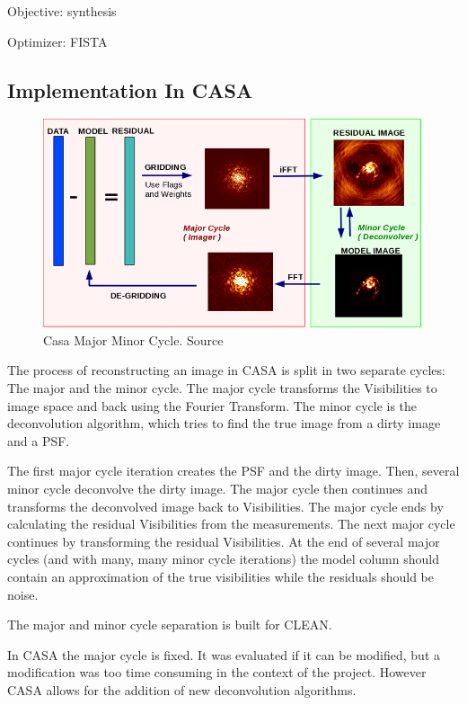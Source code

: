 Objective: synthesis

Optimizer: FISTA

\pagebreak
\subsection{Implementation In CASA}

\begin{figure}
	\centering
	\vspace{-15pt}
	\includegraphics[width=0.9\linewidth]{./chapters/04.cs/img/casa_major_minor.png}
	\caption{Casa Major Minor Cycle. Source \cite{casa2018major}}
	\label{cs:major}
	\vspace{-10pt}
\end{figure}

The process of reconstructing an image in CASA is split in two separate cycles: The major and the minor cycle. The major cycle transforms the Visibilities to image space and back using the Fourier Transform. The minor cycle is the deconvolution algorithm, which tries to find the true image from a dirty image and a PSF. 

The first major cycle iteration creates the PSF and the dirty image. Then, several minor cycle deconvolve the dirty image. The major cycle then continues and transforms the deconvolved image back to Visibilities. The major cycle ends by calculating the residual Visibilities from the measurements. The next major cycle continues by transforming the residual Visibilities. At the end of several major cycles (and with many, many minor cycle iterations) the model column should contain an approximation of the true visibilities while the residuals should be noise. 


The major and minor cycle separation is built for CLEAN.


In CASA the major cycle is fixed. It was evaluated if it can be modified, but a modification was too time consuming in the context of the project. However CASA allows for the addition of new deconvolution algorithms. 

